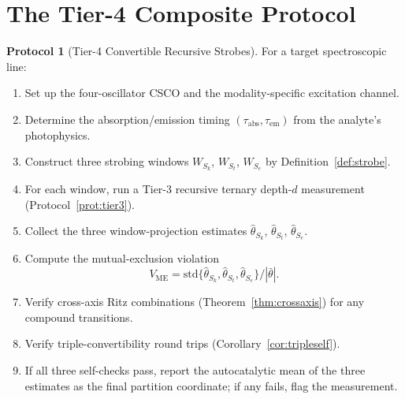 \documentclass[twocolumn,11pt,a4paper]{article}
\theoremstyle{thmstyle}
\theoremstyle{axiomstyle}
\theoremstyle{definition}
\newtheorem{protocol}[theorem]{Protocol}
\theoremstyle{remark}
\newcommand{\Vme}{V_{\mathrm{ME}}}
\begin{document}
\section{The Tier-4 Composite Protocol}
\label{sec:tier4composite}

\begin{protocol}[Tier-4 Convertible Recursive Strobes]\label{prot:tier4}
For a target spectroscopic line:
\begin{enumerate}[label=\arabic*.,nosep]
\item Set up the four-oscillator CSCO and the modality-specific excitation channel.
\item Determine the absorption/emission timing $(\tau_{\mathrm{abs}},\tau_{\mathrm{em}})$ from the analyte's photophysics.
\item Construct three strobing windows $W_{S_{k}}$, $W_{S_{t}}$, $W_{S_{e}}$ by Definition~\ref{def:strobe}.
\item For each window, run a Tier-3 recursive ternary depth-$d$ measurement (Protocol~\ref{prot:tier3}).
\item Collect the three window-projection estimates $\hat{\theta}_{S_{k}}$, $\hat{\theta}_{S_{t}}$, $\hat{\theta}_{S_{e}}$.
\item Compute the mutual-exclusion violation
\begin{equation}
\Vme=\mathrm{std}\{\hat{\theta}_{S_{k}},\hat{\theta}_{S_{t}},\hat{\theta}_{S_{e}}\}/|\bar{\theta}|.
\end{equation}
\item Verify cross-axis Ritz combinations (Theorem~\ref{thm:crossaxis}) for any compound transitions.
\item Verify triple-convertibility round trips (Corollary~\ref{cor:tripleself}).
\item If all three self-checks pass, report the autocatalytic mean of the three estimates as the final partition coordinate; if any fails, flag the measurement.
\end{enumerate}
\end{protocol}
\end{document}
